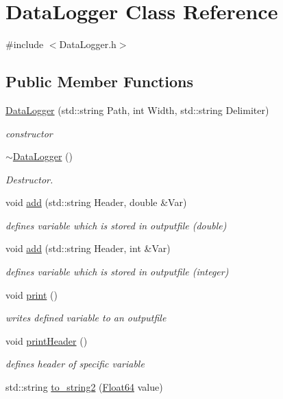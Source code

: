 \hypertarget{class_data_logger}{}\section{Data\+Logger Class Reference}
\label{class_data_logger}


{\ttfamily \#include $<$Data\+Logger.\+h$>$}

\subsection*{Public Member Functions}
\begin{DoxyCompactItemize}
\item 
\hyperlink{class_data_logger_a3ea159d4b0a7434f9806f9fdde296513}{Data\+Logger} (std\+::string Path, int Width, std\+::string Delimiter)
\begin{DoxyCompactList}\small\item\em constructor \end{DoxyCompactList}\item 
\hyperlink{class_data_logger_a9aaff109f3e7749a0a0a0313655da50a}{$\sim$\+Data\+Logger} ()
\begin{DoxyCompactList}\small\item\em Destructor. \end{DoxyCompactList}\item 
void \hyperlink{class_data_logger_a9ea6897ea2031c0ec7744018a0539704}{add} (std\+::string Header, double \&Var)
\begin{DoxyCompactList}\small\item\em defines variable which is stored in outputfile (double) \end{DoxyCompactList}\item 
void \hyperlink{class_data_logger_afbe20d50f035057e397e540c30bb4596}{add} (std\+::string Header, int \&Var)
\begin{DoxyCompactList}\small\item\em defines variable which is stored in outputfile (integer) \end{DoxyCompactList}\item 
void \hyperlink{class_data_logger_aa1bd66fc07169787398f386d9276708b}{print} ()
\begin{DoxyCompactList}\small\item\em writes defined variable to an outputfile \end{DoxyCompactList}\item 
void \hyperlink{class_data_logger_ad7247b2350411b48f323de6c91e8479c}{print\+Header} ()
\begin{DoxyCompactList}\small\item\em defines header of specific variable \end{DoxyCompactList}\item 
std\+::string \hyperlink{class_data_logger_a04fa995bcb9e7a0868ac748d0506d4e3}{to\+\_\+string2} (\hyperlink{group___tools_ga3f1431cb9f76da10f59246d1d743dc2c}{Float64} value)
\end{DoxyCompactItemize}


